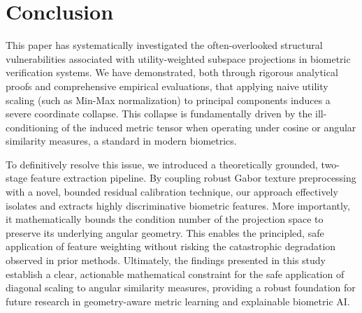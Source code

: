 \documentclass[conference]{IEEEtran}
\begin{document}
\section{Conclusion}
\label{sec:conclusion}

This paper has systematically investigated the often-overlooked structural vulnerabilities associated with utility-weighted subspace projections in biometric verification systems. We have demonstrated, both through rigorous analytical proofs and comprehensive empirical evaluations, that applying naive utility scaling (such as Min-Max normalization) to principal components induces a severe coordinate collapse. This collapse is fundamentally driven by the ill-conditioning of the induced metric tensor when operating under cosine or angular similarity measures, a standard in modern biometrics. 

To definitively resolve this issue, we introduced a theoretically grounded, two-stage feature extraction pipeline. By coupling robust Gabor texture preprocessing with a novel, bounded residual calibration technique, our approach effectively isolates and extracts highly discriminative biometric features. More importantly, it mathematically bounds the condition number of the projection space to preserve its underlying angular geometry. This enables the principled, safe application of feature weighting without risking the catastrophic degradation observed in prior methods. Ultimately, the findings presented in this study establish a clear, actionable mathematical constraint for the safe application of diagonal scaling to angular similarity measures, providing a robust foundation for future research in geometry-aware metric learning and explainable biometric AI.
\end{document}
